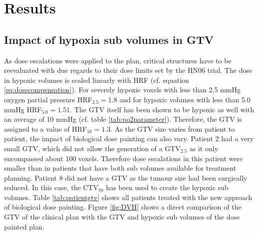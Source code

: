 \section{Results}
\subsection{Impact of hypoxia sub volumes in GTV}
As dose escalations were applied to the plan, critical structures have to be reevaluated with due regards to their dose limits set by the HN06 trial. The dose in hypoxic volumes is scaled linearly with HRF (cf. equation \ref{eq:dosecompensation}). For severely hypoxic voxels with less than 2.5 mmHg oxygen partial pressure HRF$_{2.5}=1.8$ and for hypoxic volumes with less than 5.0 mmHg HRF$_{5.0}=1.51$. The GTV itself has been shown to be hypoxic as well with an average of 10 mmHg (cf. table \ref{tab:po2parameter}). Therefore, the GTV is assigned to a value of HRF$_\mathrm{10}=1.3$. As the GTV size varies from patient to patient, the impact of biological dose painting can also vary. Patient 2 had a very small GTV, which did not allow the generation of a GTV$_{2.5}$ as it only encompassed about 100 voxels. Therefore dose escalations in this patient were smaller than in patients that have both sub volumes available for treatment planning. Patient 8 did not have a GTV as the tumour size had been surgically reduced. In this case, the CTV$_{70}$ has been used to create the hypoxic sub volumes. Table \ref{tab:patientgtv} shows all patients treated with the new approach of biological dose painting. Figure \ref{fig:DVH} shows a direct comparison of the GTV of the clinical plan with the GTV and hypoxic sub volumes of the dose painted plan. 
\begin{sidewaysfigure}[p]
\centering
{}
\caption{Dose volume histograms for the GTV of the clinical plan (green) and all volumes from biological dose painting: GTV (red), GTV$_{5.0}$ (blue), GTV$_{2.5}$ (magenta). Patient 2 did not have a GTV$_{2.5}$ as the GTV was to small. Complete delivery is not possible to the GTV and hypoxic sub volumes. Desired dose values are $D_{2.5} = 126$ Gy for the 2.5 mmHg sub volume, $D_{5.0} = 105.7$ Gy for the 5.0 mmHg sub volume and $D_\mathrm{GTV} = 91$ Gy for the GTV which was assigned with 10 mmHg.}
\label{fig:DVH}
\end{sidewaysfigure}
